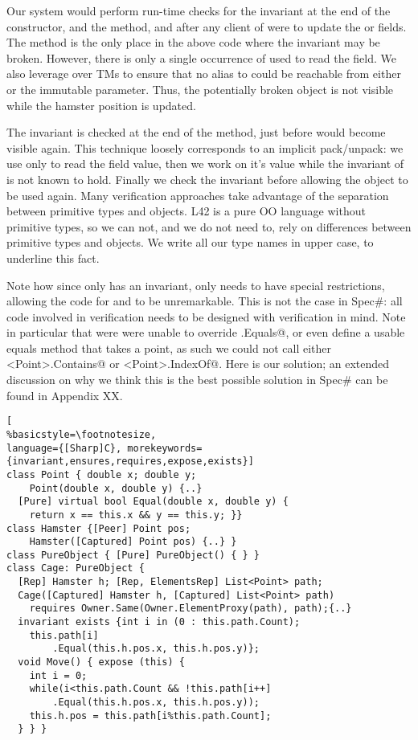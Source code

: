 Our system would perform run-time checks for the invariant
at the end of the constructor, and the \Q@moveTo@
method, and after any client of \Q@Cage@
were to update the \Q@h@ or \Q@path@ fields.
The \Q@moveTo@ method is the only place in the above code where the invariant may be broken. However, there is only a single occurrence of \Q@this@ used to read the \Q@h@ field. We also leverage over TMs to ensure that no alias to \Q@this@ could be reachable from either \Q@h@ or the immutable \Q@Point@ parameter. Thus, the potentially broken \Q@this@ object is not visible while the hamster position is updated. 

The invariant is checked at the end of the \Q@moveTo@ method, just before \Q@this@ would become visible again.
This technique loosely corresponds to an implicit pack/unpack: we use \Q@this@ only to read the field value, then we work on it's value while the invariant of \Q@this@ is not known to hold. Finally we 
check the invariant before allowing the object to  be used again.
Many verification approaches take advantage of the separation between primitive types and objects.
L42 is a pure OO language without primitive types, so we can not, and we do not need to, rely
on differences between primitive types and objects.
We write all our type names in upper case, to underline this fact.


Note how since only \Q@Cage@ has an invariant,
only \Q@Cage@ needs to have special restrictions, allowing the code for \Q@Point@ and \Q@Hamster@ to be unremarkable.
This is not the case in Spec\#: all code involved in 
verification needs to be designed with verification in mind.
Note in particular that were were unable to override \Q@Object.Equals@, or even define a usable equals method that takes a point, as such we could not call either \Q@List<Point>.Contains@ or \Q@List<Point>.IndexOf@. Here is our solution; an extended discussion on why we think this is the best possible solution in Spec\# can be found in Appendix XX.
\begin{lstlisting}[
%basicstyle=\footnotesize,
language={[Sharp]C}, morekeywords={invariant,ensures,requires,expose,exists}]
class Point { double x; double y;
	Point(double x, double y) {..}
  [Pure] virtual bool Equal(double x, double y) {
    return x == this.x && y == this.y; }}
class Hamster {[Peer] Point pos;
	Hamster([Captured] Point pos) {..} }
class PureObject { [Pure] PureObject() { } }
class Cage: PureObject {
  [Rep] Hamster h; [Rep, ElementsRep] List<Point> path;
  Cage([Captured] Hamster h, [Captured] List<Point> path)
    requires Owner.Same(Owner.ElementProxy(path), path);{..}
  invariant exists {int i in (0 : this.path.Count);
    this.path[i]
		.Equal(this.h.pos.x, this.h.pos.y)};
  void Move() { expose (this) {
    int i = 0;
    while(i<this.path.Count && !this.path[i++]
		.Equal(this.h.pos.x, this.h.pos.y));
    this.h.pos = this.path[i%this.path.Count];
  } } }
\end{lstlisting}


